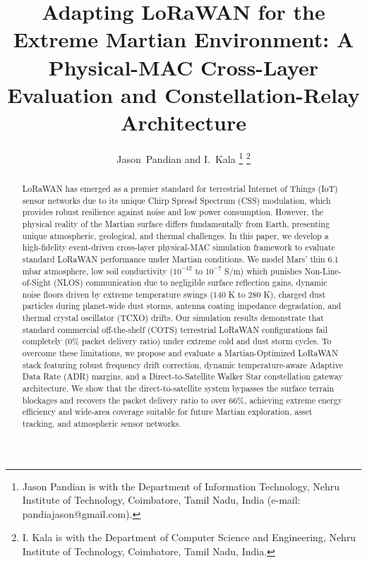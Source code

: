 \documentclass[journal,10pt,doublecolumn]{IEEEtran}
\begin{document}
\title{Adapting LoRaWAN for the Extreme Martian Environment: A Physical-MAC Cross-Layer Evaluation and Constellation-Relay Architecture}

\author{Jason~Pandian and I.~Kala%
\thanks{Jason Pandian is with the Department of Information Technology, Nehru Institute of Technology, Coimbatore, Tamil Nadu, India (e-mail: pandiajason@gmail.com).}%
\thanks{I. Kala is with the Department of Computer Science and Engineering, Nehru Institute of Technology, Coimbatore, Tamil Nadu, India.}}

\maketitle

\begin{abstract}
LoRaWAN has emerged as a premier standard for terrestrial Internet of Things (IoT) sensor networks due to its unique Chirp Spread Spectrum (CSS) modulation, which provides robust resilience against noise and low power consumption. However, the physical reality of the Martian surface differs fundamentally from Earth, presenting unique atmospheric, geological, and thermal challenges. In this paper, we develop a high-fidelity event-driven cross-layer physical-MAC simulation framework to evaluate standard LoRaWAN performance under Martian conditions. We model Mars' thin 6.1 mbar atmosphere, low soil conductivity ($10^{-12}$ to $10^{-7}$ S/m) which punishes Non-Line-of-Sight (NLOS) communication due to negligible surface reflection gains, dynamic noise floors driven by extreme temperature swings ($140$ K to $280$ K), charged dust particles during planet-wide dust storms, antenna coating impedance degradation, and thermal crystal oscillator (TCXO) drifts. Our simulation results demonstrate that standard commercial off-the-shelf (COTS) terrestrial LoRaWAN configurations fail completely (0\% packet delivery ratio) under extreme cold and dust storm cycles. To overcome these limitations, we propose and evaluate a Martian-Optimized LoRaWAN stack featuring robust frequency drift correction, dynamic temperature-aware Adaptive Data Rate (ADR) margins, and a Direct-to-Satellite Walker Star constellation gateway architecture. We show that the direct-to-satellite system bypasses the surface terrain blockages and recovers the packet delivery ratio to over 66\%, achieving extreme energy efficiency and wide-area coverage suitable for future Martian exploration, asset tracking, and atmospheric sensor networks.
\end{abstract}
\end{document}
